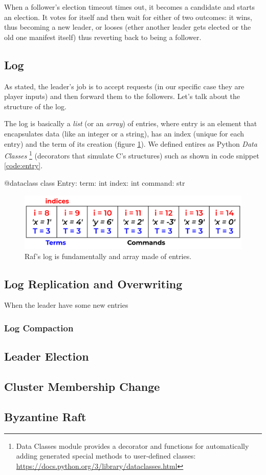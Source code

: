 When a follower's election timeout times out, it becomes a candidate and starts an election. It votes for itself and then wait for either of two outcomes: it wins, thus becoming a new leader, or looses (ether another leader gets elected or the old one manifest itself) thus reverting back to being a follower.

\subsection{Log}

As stated, the leader's job is to accept requests (in our specific case they are player inputs) and then forward them to the followers. Let's talk about the structure of the log. 

The log is basically a \textit{list} (or an \textit{array}) of entries, where entry is an element that encapsulates data (like an integer or a string), has an index (unique for each entry) and the term of its creation (figure \ref{fig:logStructure}). We defined entires as Python \textit{Data Classes} \footnote{Data Classes module provides a decorator and functions for automatically adding generated special methods to user-defined classes: \url{https://docs.python.org/3/library/dataclasses.html}} (decorators that simulate C's structures) such as shown in code snippet \ref{code:entry}.

\label{code:entry}
\begin{python} 
@dataclass
class Entry:
    term: int
    index: int
    command: str 
\end{python}

\begin{figure}[h]
  \centering
  \includegraphics[width=.8\linewidth]{images/logStructure.png}
  
  \caption{Raf's log is fundamentally and array made of entries.}
  \label{fig:logStructure}
\end{figure}

\subsection{Log Replication and Overwriting}

When the leader have some new entries 

\subsubsection{Log Compaction}

\subsection{Leader Election}

\subsection{Cluster Membership Change}

\subsection{Byzantine Raft}